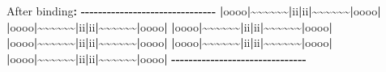 \documentclass[
  a4paper,
  twoside,
  openright]{book}
\newenvironment{Shaded}{\begin{snugshade}}{\end{snugshade}}
\newcommand{\ErrorTok}[1]{\textcolor[rgb]{0.64,0.00,0.00}{\textbf{#1}}}
\newcommand{\NormalTok}[1]{#1}
\newcommand{\SpecialCharTok}[1]{\textcolor[rgb]{0.81,0.36,0.00}{\textbf{#1}}}
\theoremstyle{definition}
\theoremstyle{definition}
\theoremstyle{definition}
\theoremstyle{definition}
\theoremstyle{remark}
\begin{document}
\begin{itemize}
\begin{itemize}
\begin{Shaded}
\begin{Highlighting}[]
\NormalTok{After binding}\SpecialCharTok{:}
\SpecialCharTok{{-}{-}{-}{-}{-}{-}{-}{-}{-}{-}{-}{-}{-}{-}{-}{-}{-}{-}{-}{-}{-}{-}{-}{-}{-}{-}{-}{-}{-}{-}{-}}
\ErrorTok{|}\NormalTok{oooo}\SpecialCharTok{|}\ErrorTok{\textasciitilde{}\textasciitilde{}\textasciitilde{}\textasciitilde{}\textasciitilde{}\textasciitilde{}|}\NormalTok{ii}\SpecialCharTok{|}\NormalTok{ii}\SpecialCharTok{|}\ErrorTok{\textasciitilde{}\textasciitilde{}\textasciitilde{}\textasciitilde{}\textasciitilde{}\textasciitilde{}|}\NormalTok{oooo}\SpecialCharTok{|}
\ErrorTok{|}\NormalTok{oooo}\SpecialCharTok{|}\ErrorTok{\textasciitilde{}\textasciitilde{}\textasciitilde{}\textasciitilde{}\textasciitilde{}\textasciitilde{}|}\NormalTok{ii}\SpecialCharTok{|}\NormalTok{ii}\SpecialCharTok{|}\ErrorTok{\textasciitilde{}\textasciitilde{}\textasciitilde{}\textasciitilde{}\textasciitilde{}\textasciitilde{}|}\NormalTok{oooo}\SpecialCharTok{|}
\ErrorTok{|}\NormalTok{oooo}\SpecialCharTok{|}\ErrorTok{\textasciitilde{}\textasciitilde{}\textasciitilde{}\textasciitilde{}\textasciitilde{}\textasciitilde{}|}\NormalTok{ii}\SpecialCharTok{|}\NormalTok{ii}\SpecialCharTok{|}\ErrorTok{\textasciitilde{}\textasciitilde{}\textasciitilde{}\textasciitilde{}\textasciitilde{}\textasciitilde{}|}\NormalTok{oooo}\SpecialCharTok{|}
\ErrorTok{|}\NormalTok{oooo}\SpecialCharTok{|}\ErrorTok{\textasciitilde{}\textasciitilde{}\textasciitilde{}\textasciitilde{}\textasciitilde{}\textasciitilde{}|}\NormalTok{ii}\SpecialCharTok{|}\NormalTok{ii}\SpecialCharTok{|}\ErrorTok{\textasciitilde{}\textasciitilde{}\textasciitilde{}\textasciitilde{}\textasciitilde{}\textasciitilde{}|}\NormalTok{oooo}\SpecialCharTok{|}
\ErrorTok{|}\NormalTok{oooo}\SpecialCharTok{|}\ErrorTok{\textasciitilde{}\textasciitilde{}\textasciitilde{}\textasciitilde{}\textasciitilde{}\textasciitilde{}|}\NormalTok{ii}\SpecialCharTok{|}\NormalTok{ii}\SpecialCharTok{|}\ErrorTok{\textasciitilde{}\textasciitilde{}\textasciitilde{}\textasciitilde{}\textasciitilde{}\textasciitilde{}|}\NormalTok{oooo}\SpecialCharTok{|}
\ErrorTok{|}\NormalTok{oooo}\SpecialCharTok{|}\ErrorTok{\textasciitilde{}\textasciitilde{}\textasciitilde{}\textasciitilde{}\textasciitilde{}\textasciitilde{}|}\NormalTok{ii}\SpecialCharTok{|}\NormalTok{ii}\SpecialCharTok{|}\ErrorTok{\textasciitilde{}\textasciitilde{}\textasciitilde{}\textasciitilde{}\textasciitilde{}\textasciitilde{}|}\NormalTok{oooo}\SpecialCharTok{|}
\SpecialCharTok{{-}{-}{-}{-}{-}{-}{-}{-}{-}{-}{-}{-}{-}{-}{-}{-}{-}{-}{-}{-}{-}{-}{-}{-}{-}{-}{-}{-}{-}{-}{-}}
\end{Highlighting}
\end{Shaded}

\end{itemize}
\end{itemize}
\end{document}
